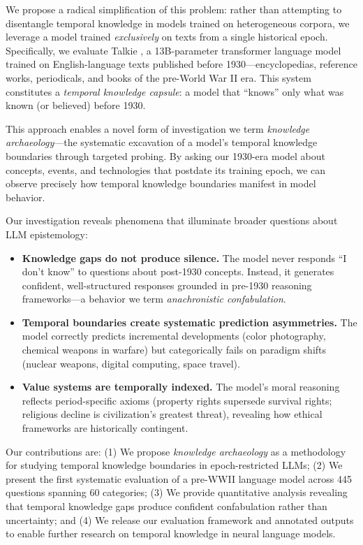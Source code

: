 \documentclass[11pt]{article}
\begin{document}
We propose a radical simplification of this problem: rather than attempting to disentangle temporal knowledge in models trained on heterogeneous corpora, we leverage a model trained \textit{exclusively} on texts from a single historical epoch. Specifically, we evaluate Talkie \cite{radford2026talkie}, a 13B-parameter transformer language model trained on English-language texts published before 1930---encyclopedias, reference works, periodicals, and books of the pre-World War II era. This system constitutes a \textit{temporal knowledge capsule}: a model that ``knows'' only what was known (or believed) before 1930.

This approach enables a novel form of investigation we term \textit{knowledge archaeology}---the systematic excavation of a model's temporal knowledge boundaries through targeted probing. By asking our 1930-era model about concepts, events, and technologies that postdate its training epoch, we can observe precisely how temporal knowledge boundaries manifest in model behavior.

Our investigation reveals phenomena that illuminate broader questions about LLM epistemology:

\begin{itemize}[nosep,leftmargin=*]
\item \textbf{Knowledge gaps do not produce silence.} The model never responds ``I don't know'' to questions about post-1930 concepts. Instead, it generates confident, well-structured responses grounded in pre-1930 reasoning frameworks---a behavior we term \textit{anachronistic confabulation}.
\item \textbf{Temporal boundaries create systematic prediction asymmetries.} The model correctly predicts incremental developments (color photography, chemical weapons in warfare) but categorically fails on paradigm shifts (nuclear weapons, digital computing, space travel).
\item \textbf{Value systems are temporally indexed.} The model's moral reasoning reflects period-specific axioms (property rights supersede survival rights; religious decline is civilization's greatest threat), revealing how ethical frameworks are historically contingent.
\end{itemize}

Our contributions are: (1) We propose \textit{knowledge archaeology} as a methodology for studying temporal knowledge boundaries in epoch-restricted LLMs; (2) We present the first systematic evaluation of a pre-WWII language model across 445 questions spanning 60 categories; (3) We provide quantitative analysis revealing that temporal knowledge gaps produce confident confabulation rather than uncertainty; and (4) We release our evaluation framework and annotated outputs to enable further research on temporal knowledge in neural language models.
\end{document}
